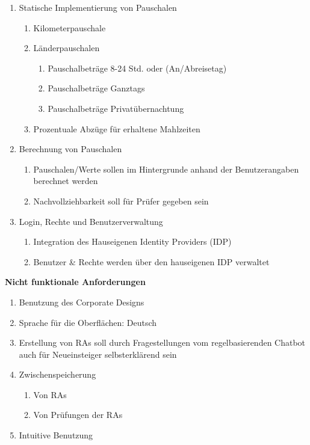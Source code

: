 \begin{enumerate}
	\item Statische Implementierung von Pauschalen
	\begin{enumerate}
		\item Kilometerpauschale
		\item Länderpauschalen
		\begin{enumerate}
			\item Pauschalbeträge 8-24 Std. oder (An/Abreisetag)
			\item Pauschalbeträge Ganztags
			\item Pauschalbeträge Privatübernachtung
		\end{enumerate}
		\item Prozentuale Abzüge für erhaltene Mahlzeiten
	\end{enumerate}
	\item Berechnung von Pauschalen
	\begin{enumerate}
		\item Pauschalen/Werte sollen im Hintergrunde anhand der Benutzerangaben berechnet werden
		\item Nachvollziehbarkeit soll für Prüfer gegeben sein
	\end{enumerate}
	\item Login, Rechte und Benutzerverwaltung
	\begin{enumerate}
		\item Integration des Hauseigenen Identity Providers (IDP)
		\item Benutzer \& Rechte werden über den hauseigenen IDP verwaltet
	\end{enumerate}
\end{enumerate}

\textbf{Nicht funktionale Anforderungen}
\begin{enumerate}
	\item Benutzung des Corporate Designs
	\item Sprache für die Oberflächen: Deutsch
	\item Erstellung von RAs soll durch Fragestellungen vom regelbasierenden Chatbot auch für Neueinsteiger selbsterklärend sein
	\item Zwischenspeicherung 
	\begin{enumerate}
		\item Von RAs
		\item Von Prüfungen der RAs
	\end{enumerate}
	\item Intuitive Benutzung
\end{enumerate}

